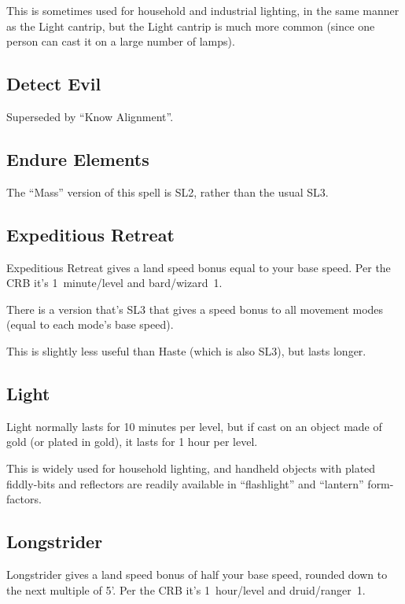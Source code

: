 This is sometimes used for household and industrial lighting, in the same
manner as the Light cantrip, but the Light cantrip is much more common
(since one person can cast it on a large number of lamps).
%

%
\subsection{Detect Evil}

Superseded by ``Know Alignment''.
%

%
\subsection{Endure Elements}

The ``Mass'' version of this spell is SL2, rather than the usual SL3.

%
\subsection{Expeditious Retreat}

Expeditious Retreat gives a land speed bonus equal to your base speed.
Per the CRB it's 1~minute/level and bard/wizard~1.

There is a version that's SL3 that gives a speed bonus to all movement
modes (equal to each mode's base speed).

This is slightly less useful than Haste (which is also SL3), but lasts
longer.
%

%
\subsection{Light}

Light normally lasts for 10 minutes per level, but if cast on an object
made of gold (or plated in gold), it lasts for 1 hour per level.

This is widely used for household lighting, and handheld objects with
plated fiddly-bits and reflectors are readily available in ``flashlight''
and ``lantern'' form-factors.
%

%
\subsection{Longstrider}

Longstrider gives a land speed bonus of half your base speed, rounded down
to the next multiple of 5'. Per the CRB it's 1~hour/level and
druid/ranger~1.


